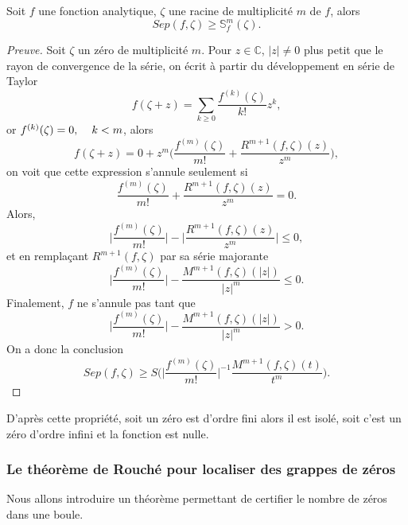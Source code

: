 \documentclass[a4paper,10pt]{article}
\begin{document}
	\begin{theorem}
		Soit $f$ une fonction analytique, $\zeta$ une racine de multiplicité $m$ de $f$, alors
		\[Sep(f,\zeta) \geq \mathbb{S}_{f}^{m}(\zeta).\]
	\end{theorem}
	\begin{proof}[Preuve]
		Soit $\zeta$ un zéro de multiplicité $m$.
		Pour $z \in \mathbb{C}$, $|z|\neq 0$ plus petit que le rayon de convergence de la série, on écrit à partir du développement en série de Taylor
		\[f(\zeta +z)=\sum_{k\geq 0}\frac{f^{(k)}(\zeta)}{k!}z^k,\]
		or $f^{(k)}(\zeta)=0, \hspace{4mm} k<m$, alors
		\[f(\zeta +z)=0+z^m\Big(\frac{f^{(m)}(\zeta)}{m!}+\frac{R^{m+1}(f,\zeta)(z)}{z^m}\Big),\]
		on voit que cette expression s'annule seulement si 
		\[\frac{f^{(m)}(\zeta)}{m!}+\frac{R^{m+1}(f,\zeta)(z)}{z^m}=0.\]
		Alors,
		\[\Big|\frac{f^{(m)}(\zeta)}{m!}\Big|-\Big|\frac{R^{m+1}(f,\zeta)(z)}{z^m}\Big|\leq 0,\]
		et en remplaçant $R^{m+1}(f,\zeta)$ par sa série majorante
		\[\Big|\frac{f^{(m)}(\zeta)}{m!}\Big|-\frac{M^{m+1}(f,\zeta)(|z|)}{|z|^m}\leq 0.\]
		Finalement, $f$ ne s'annule pas tant que 
		\[\Big|\frac{f^{(m)}(\zeta)}{m!}\Big|-\frac{M^{m+1}(f,\zeta)(|z|)}{|z|^m}> 0.\]
		On a donc la conclusion
		\[Sep(f,\zeta) \geq S\Big(\Big|\frac{f^{(m)}(\zeta)}{m!}\Big|^{-1}\frac{M^{m+1}(f,\zeta)(t)}{t^{m}}\Big).\]
	\end{proof}
	D'après cette propriété, soit un zéro est d'ordre fini alors il est isolé, soit c'est un zéro d'ordre infini et la fonction est nulle.
	
	\subsubsection{Le théorème de Rouché pour localiser des grappes de zéros}
	
	\noindent Nous allons introduire un théorème permettant de certifier le nombre de zéros dans une boule.
	
\end{document}
